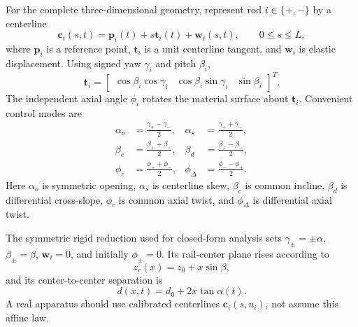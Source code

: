 \documentclass[11pt]{article}
\numberwithin{equation}{section}
\theoremstyle{definition}
\theoremstyle{remark}
\begin{document}
For the complete three-dimensional geometry, represent rod $i\in\{+,-\}$ by a centerline
\begin{equation}
  \bm c_i(s,t)=\bm p_i(t)+s\bm t_i(t)+\bm w_i(s,t),
  \qquad 0\leq s\leq L,
  \label{eq:rodcenterline}
\end{equation}
where $\bm p_i$ is a reference point, $\bm t_i$ is a unit centerline tangent, and $\bm w_i$ is elastic displacement.  Using signed yaw $\gamma_i$ and pitch $\beta_i$,
\begin{equation}
  \bm t_i=
  \begin{bmatrix}
  \cos\beta_i\cos\gamma_i &
  \cos\beta_i\sin\gamma_i &
  \sin\beta_i
  \end{bmatrix}^{T}.
  \label{eq:rodattitude}
\end{equation}
The independent axial angle $\phi_i$ rotates the material surface about $\bm t_i$.  Convenient control modes are
\begin{align}
  \alpha_o&=\frac{\gamma_+-\gamma_-}{2},
  &\alpha_s&=\frac{\gamma_++\gamma_-}{2},\\
  \beta_c&=\frac{\beta_++\beta_-}{2},
  &\beta_d&=\frac{\beta_+-\beta_-}{2},\\
  \phi_c&=\frac{\phi_++\phi_-}{2},
  &\phi_\Delta&=\frac{\phi_- -\phi_+}{2}.
  \label{eq:controlmodes}
\end{align}
Here $\alpha_o$ is symmetric opening, $\alpha_s$ is centerline skew, $\beta_c$ is common incline, $\beta_d$ is differential cross-slope, $\phi_c$ is common axial twist, and $\phi_\Delta$ is differential axial twist.

The symmetric rigid reduction used for closed-form analysis sets $\gamma_\pm=\pm\alpha$, $\beta_\pm=\beta$, $\bm w_i=0$, and initially $\phi_\pm=0$.  Its rail-center plane rises according to
\begin{equation}
  z_r(x)=z_0+x\sin\beta,
  \label{eq:railheight}
\end{equation}
and its center-to-center separation is
\begin{equation}
  d(x,t)=d_0+2x\tan\alpha(t).
  \label{eq:separation}
\end{equation}
A real apparatus should use calibrated centerlines $\bm c_i(s,u_i)$, not assume this affine law.
\end{document}
